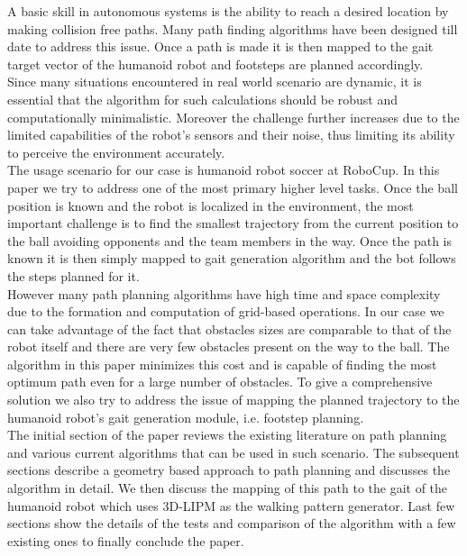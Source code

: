 \documentclass[letterpaper, 10 pt, conference]{ieeeconf}  %
\begin{document}
A basic skill in autonomous systems is the ability to reach a desired location by making collision free paths. Many path finding algorithms have been designed till date to address this issue. Once a path is made it is then mapped to the gait target vector of the humanoid robot and footsteps are planned accordingly. \\
Since many situations encountered in real world scenario are dynamic, it is essential that the algorithm for such calculations should be robust and computationally minimalistic. Moreover the challenge further increases due to the limited capabilities of the robot's sensors and their noise, thus limiting its ability to perceive the environment accurately.\\
The usage scenario for our case is humanoid robot soccer at RoboCup. In this paper we try to address one of the most primary higher level tasks. Once the ball position is known and the robot is localized in the environment, the most important challenge is to find the smallest trajectory from the current position to the ball avoiding opponents and the team members in the way. Once the path is known it is then simply mapped to gait generation algorithm and the bot follows the steps planned for it.\\
However many path planning algorithms have high time and space complexity due to the formation and computation of grid-based operations. In our case we can take advantage of the fact that obstacles sizes are comparable to that of the robot itself and there are very few obstacles present on the way to the ball. The algorithm in this paper minimizes this cost and is capable of finding the most optimum path even for a large number of obstacles. To give a comprehensive solution we also try to address the issue of mapping the planned trajectory to the humanoid robot's gait generation module, i.e. footstep planning.\\
The initial section of the paper reviews the existing literature on path planning and various current algorithms that can be used in such scenario. The subsequent sections describe a geometry based approach to path planning and discusses the algorithm in detail. We then discuss the mapping of this path to the gait of the humanoid robot which uses 3D-LIPM as the walking pattern generator. Last few sections show the details of the tests and comparison of the algorithm with a few existing ones to finally conclude the paper.
\end{document}
